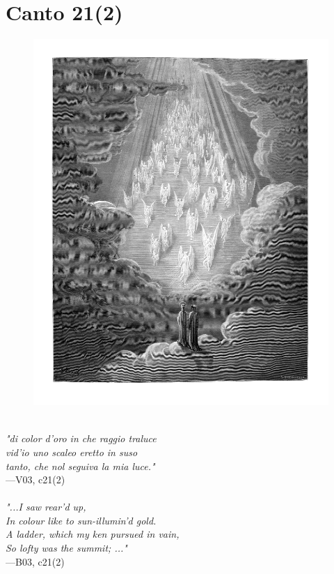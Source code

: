 \documentclass[../Dore_vision.tex]{subfiles}
\begin{document}
\newpage

\section{Canto 21(2)}

\begin{figure}[ht]
\centering
\includegraphics[height=\figsize]{illustrations/book_3/V03, c21(2).jpg}
\end{figure}

\begin{center}
\begin{minipage}{0.8\linewidth}
\textit{\\
"di color d’oro in che raggio traluce\\vid’io uno scaleo eretto in suso\\tanto, che nol seguiva la mia luce."} \\
—V03, c21(2) \\~\\
\textit{"...I saw rear'd up,\\In colour like to sun-illumin'd gold.\\A ladder, which my ken pursued in vain,\\So lofty was the summit; ..."} \\
—B03, c21(2)
\end{minipage}
\end{center}
\end{document}
